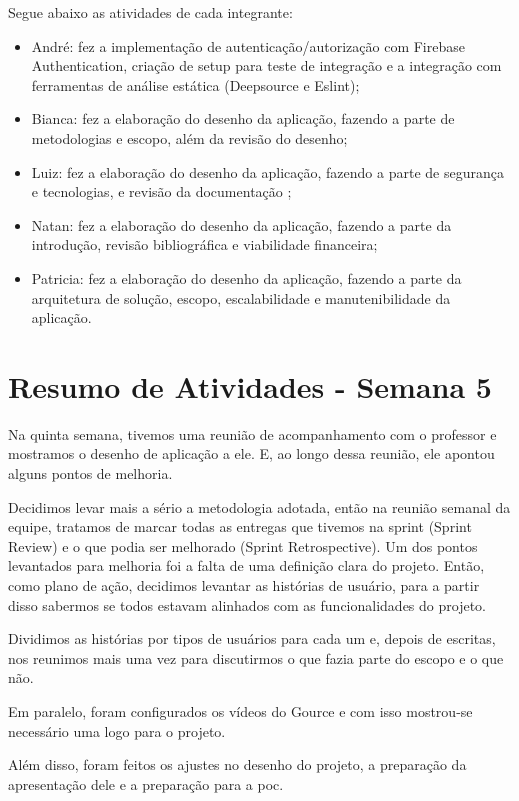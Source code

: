 \begin{apendicesenv}
Segue abaixo as atividades de cada integrante:

\begin{itemize}
\item André: fez a implementação de autenticação/autorização com Firebase Authentication, criação de \gls{setup} para teste de integração e a integração com ferramentas de análise estática (Deepsource e Eslint);
\item Bianca: fez a elaboração do desenho da aplicação, fazendo a parte de metodologias e escopo, além da revisão do desenho;
\item Luiz: fez a elaboração do desenho da aplicação, fazendo a parte de segurança e tecnologias, e revisão da documentação ;
\item Natan: fez a elaboração do desenho da aplicação, fazendo a parte da introdução, revisão bibliográfica e viabilidade financeira;
\item Patricia: fez a elaboração do desenho da aplicação, fazendo a parte da arquitetura de solução, escopo, escalabilidade e manutenibilidade da aplicação.
\end{itemize}

\section{Resumo de Atividades - Semana 5}
Na quinta semana, tivemos uma reunião de acompanhamento com o professor e mostramos o desenho de aplicação a ele. E, ao longo dessa reunião, ele apontou alguns pontos de melhoria.

Decidimos levar mais a sério a metodologia adotada, então na reunião semanal da equipe, tratamos de marcar todas as entregas que tivemos na \gls{sprint} (Sprint Review) e o que podia ser melhorado (Sprint Retrospective). Um dos pontos levantados para melhoria foi a falta de uma definição clara do projeto. Então, como plano de ação, decidimos levantar as histórias de usuário, para a partir disso sabermos se todos estavam alinhados com as funcionalidades do projeto. 

Dividimos as histórias por tipos de usuários para cada um e, depois de escritas, nos reunimos mais uma vez para discutirmos o que fazia parte do escopo e o que não.

Em paralelo, foram configurados os vídeos do Gource e com isso mostrou-se necessário uma logo para o projeto.

Além disso, foram feitos os ajustes no desenho do projeto, a preparação da apresentação dele e a preparação para a \ac{poc}.


\end{apendicesenv}

